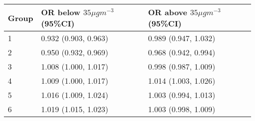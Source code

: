 \begin{tabular}{lll}
  \hline
Group & OR below $35 \mu g m^{-3}$ (95\%CI) & OR above $35 \mu g m^{-3}$ (95\%CI) \\ 
  \hline
   1 & 0.932 (0.903, 0.963) & 0.989 (0.947, 1.032) \\ 
     2 & 0.950 (0.932, 0.969) & 0.968 (0.942, 0.994) \\ 
     3 & 1.008 (1.000, 1.017) & 0.998 (0.987, 1.009) \\ 
     4 & 1.009 (1.000, 1.017) & 1.014 (1.003, 1.026) \\ 
     5 & 1.016 (1.009, 1.024) & 1.003 (0.994, 1.013) \\ 
     6 & 1.019 (1.015, 1.023) & 1.003 (0.998, 1.009) \\ 
   \hline
\end{tabular}

